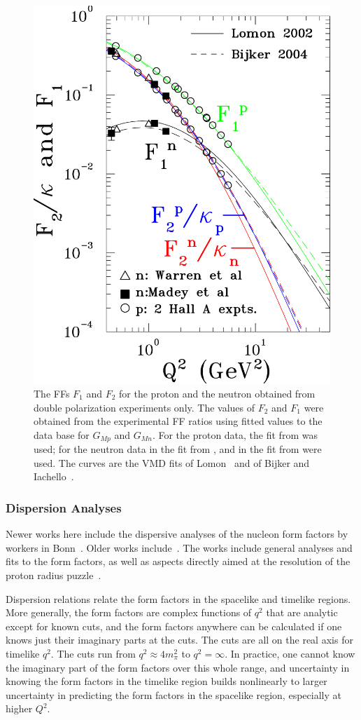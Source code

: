 %
\begin{figure}[h]
\begin{center}
\includegraphics[width = 2.5 in]{f2andf1_pandn_col.pdf}
\caption{\small The FFs $F_1$ and $F_2$ for the proton and the neutron obtained
from double polarization experiments only.
The values of $F_2$ and $F_1$ were obtained from the experimental FF ratios
using fitted values to the data base for $G_{Mp}$ and $G_{Mn}$. 
For the proton data, the fit from \cite{kelly04} was used; 
for the neutron data in \cite{madey} the fit from \cite{kelly04}, and 
in \cite{warren} the fit from \cite{kubon} were used. 
The curves are the VMD fits of Lomon~\cite{lomon}
and of Bijker and Iachello~\cite{bijker}.}
\label{fig:f2andf1}
\end{center}
\end{figure}




\subsubsection{Dispersion Analyses}
\label{subsubsec:da}

Newer works here include the dispersive analyses of the nucleon form factors by workers in Bonn~\cite{Lorenz:2012tm,Lorenz:2014vha,Lorenz:2014yda}.  Older works include~\cite{Baldini:2005xx,Belushkin:2006qa,BaldiniFerroli:2012pr}.  The works include general analyses and fits to the form factors, as well as aspects directly aimed at the resolution of the proton radius puzzle~\cite{Lorenz:2012tm,Lorenz:2014vha,Lorenz:2014yda}.

Dispersion relations relate the form factors in the spacelike and timelike regions.  More generally, the form factors are complex functions of $q^2$ that are analytic except for known cuts, and the form factors anywhere can be calculated if one knows just their imaginary parts at the cuts.  The cuts are all on the real axis for timelike $q^2$.  The cuts run from $q^2 \approx 4 m_\pi^2$ to $q^2 = \infty$.  In practice, one cannot know the imaginary part of the form factors over this whole range, and uncertainty in knowing the form factors in the timelike region builds nonlinearly to larger uncertainty in predicting the form factors in the spacelike region, especially at higher $Q^2$.

